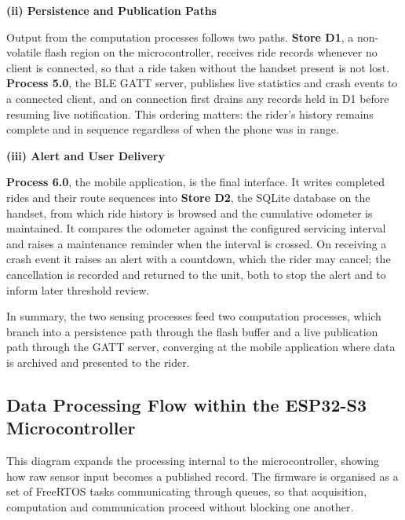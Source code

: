\documentclass[12pt,a4paper,oneside]{report}
\begin{document}
\vspace{0.5em}
\noindent\textbf{(ii) Persistence and Publication Paths}

Output from the computation processes follows two paths. \textbf{Store D1}, a non-volatile
flash region on the microcontroller, receives ride records whenever no client is connected,
so that a ride taken without the handset present is not lost. \textbf{Process 5.0}, the BLE
GATT server, publishes live statistics and crash events to a connected client, and on
connection first drains any records held in D1 before resuming live notification. This
ordering matters: the rider's history remains complete and in sequence regardless of when
the phone was in range.

\vspace{0.5em}
\noindent\textbf{(iii) Alert and User Delivery}

\textbf{Process 6.0}, the mobile application, is the final interface. It writes completed
rides and their route sequences into \textbf{Store D2}, the SQLite database on the handset,
from which ride history is browsed and the cumulative odometer is maintained. It compares
the odometer against the configured servicing interval and raises a maintenance reminder
when the interval is crossed. On receiving a crash event it raises an alert with a
countdown, which the rider may cancel; the cancellation is recorded and returned to the
unit, both to stop the alert and to inform later threshold review.

In summary, the two sensing processes feed two computation processes, which branch into a
persistence path through the flash buffer and a live publication path through the GATT
server, converging at the mobile application where data is archived and presented to the
rider.

\subsection{Data Processing Flow within the ESP32-S3 Microcontroller}

This diagram expands the processing internal to the microcontroller, showing how raw sensor
input becomes a published record. The firmware is organised as a set of FreeRTOS tasks
communicating through queues, so that acquisition, computation and communication proceed
without blocking one another.
\end{document}
